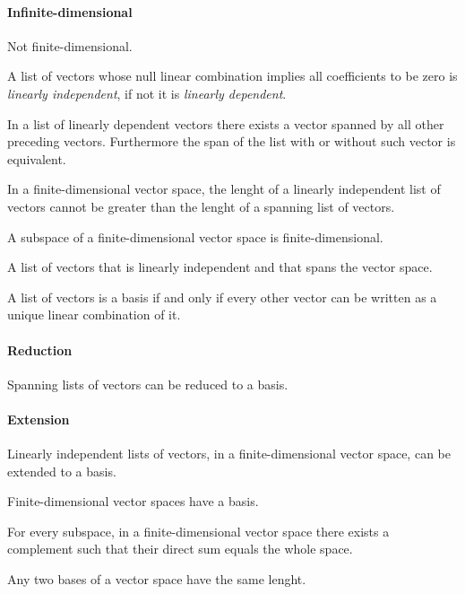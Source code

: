 \begin{multicols}{3}
  \paragraph{\textbf{Infinite-dimensional}}
  Not finite-dimensional.
  
  A list of vectors whose null linear combination implies all coefficients to be zero is \textit{linearly independent},
  if not it is \textit{linearly dependent}.

  In a list of linearly dependent vectors there exists a vector spanned by all other preceding vectors. Furthermore the span of the list with or without such vector is equivalent.
  
  In a finite-dimensional vector space, the lenght of a linearly independent list of vectors cannot be greater than the lenght of a spanning list of vectors.
  
  A subspace of a finite-dimensional vector space is finite-dimensional.
  
  A list of vectors that is linearly independent and that spans the vector space.
  
  A list of vectors is a basis if and only if every other vector can be written as a unique linear combination of it.
  
  \paragraph{\textbf{Reduction}}
  Spanning lists of vectors can be reduced to a basis.
  \paragraph{\textbf{Extension}}
  Linearly independent lists of vectors, in a finite-dimensional vector space, can be extended to a basis.

  Finite-dimensional vector spaces have a basis.
  
  For every subspace, in a finite-dimensional vector space there exists a complement such that their direct sum equals the whole space.
  
  Any two bases of a vector space have the same lenght.
  

\end{multicols}
